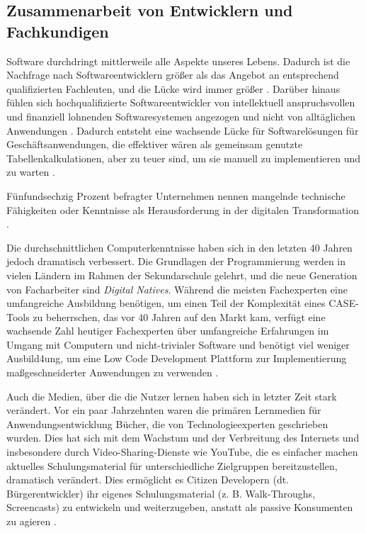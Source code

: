 \documentclass[12pt]{article} %
\begin{document}
	\subsection{Zusammenarbeit von Entwicklern und Fachkundigen} \label{Personalmangel}	
	Software durchdringt mittlerweile alle Aspekte unseres Lebens. Dadurch ist die Nachfrage nach Softwareentwicklern größer als das Angebot an entsprechend qualifizierten Fachleuten, und die Lücke wird immer größer \autocite{DiRuscio.2022}. Darüber hinaus fühlen sich hochqualifizierte Softwareentwickler von intellektuell anspruchsvollen und finanziell lohnenden Softwaresystemen angezogen und nicht von alltäglichen Anwendungen \autocite{DiRuscio.2022}. Dadurch entsteht eine wachsende Lücke für Softwarelösungen für Geschäftsanwendungen, die effektiver wären als gemeinsam genutzte Tabellenkalkulationen, aber zu teuer sind, um sie manuell zu implementieren und zu warten \autocite{DiRuscio.2022}.

	Fünfundsechzig Prozent befragter Unternehmen nennen mangelnde technische Fähigkeiten oder Kenntnisse als Herausforderung in der digitalen Transformation \autocite{EmmaVanPelt.2019}. \newline %
	
	Die durchschnittlichen Computerkenntnisse haben sich in den letzten 40 Jahren jedoch dramatisch verbessert. Die Grundlagen der Programmierung werden in vielen Ländern im Rahmen der Sekundarschule gelehrt, und die neue Generation von Facharbeiter sind \emph{Digital Natives}. Während die meisten Fachexperten eine umfangreiche Ausbildung benötigen, um einen Teil der Komplexität eines CASE-Tools zu beherrschen, das vor 40 Jahren auf den Markt kam, verfügt eine wachsende Zahl heutiger Fachexperten über umfangreiche Erfahrungen im Umgang mit Computern und nicht-trivialer Software und benötigt viel weniger Ausbild4ung, um eine Low Code Development Plattform zur Implementierung maßgeschneiderter Anwendungen zu verwenden \autocite{DiRuscio.2022}. \newline
	
	Auch die Medien, über die die Nutzer lernen haben sich in letzter Zeit stark verändert. Vor ein paar Jahrzehnten waren die primären Lernmedien für Anwendungsentwicklung Bücher, die von Technologieexperten geschrieben wurden. Dies hat sich mit dem Wachstum und der Verbreitung des Internets und insbesondere durch Video-Sharing-Dienste wie YouTube, die es einfacher machen aktuelles Schulungsmaterial für unterschiedliche Zielgruppen bereitzustellen, dramatisch verändert.
	Dies ermöglicht es Citizen Developern (dt. Bürgerentwickler) ihr eigenes Schulungsmaterial (z. B. Walk-Throughs, Screencasts) zu entwickeln und weiterzugeben, anstatt als passive Konsumenten zu agieren \autocite{DiRuscio.2022}. \newline
	
\end{document}
